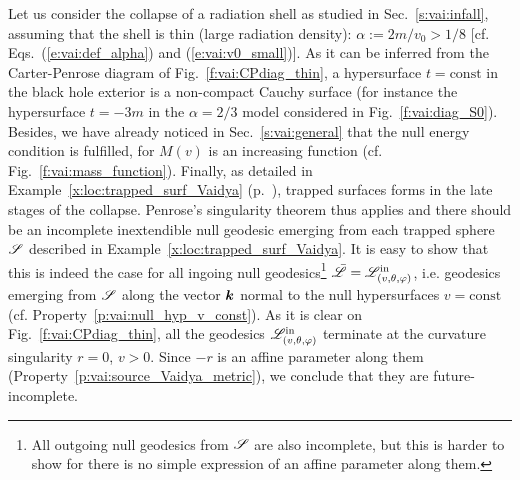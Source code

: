 \begin{example}
\label{x:loc:Penrose_thm_Vaidya}
Let us consider the collapse of a radiation shell
as studied in Sec.~\ref{s:vai:infall}, assuming that the shell is thin
(large radiation density): $\alpha := 2m/v_0 > 1/8$
[cf. Eqs.~(\ref{e:vai:def_alpha}) and (\ref{e:vai:v0_small})].
As it can be inferred from the Carter-Penrose diagram of Fig.~\ref{f:vai:CPdiag_thin},
a hypersurface $t=\mathrm{const}$ in the black hole exterior
is a non-compact Cauchy surface (for instance the hypersurface $t=-3m$ in
the $\alpha=2/3$ model considered in Fig.~\ref{f:vai:diag_S0}).
Besides, we have already noticed in Sec.~\ref{s:vai:general} that the null energy
condition is fulfilled, for $M(v)$ is an increasing function (cf. Fig.~\ref{f:vai:mass_function}).
Finally, as detailed in Example~\ref{x:loc:trapped_surf_Vaidya}
(p.~\pageref{x:loc:trapped_surf_Vaidya}), trapped surfaces forms in the late
stages of the collapse.
Penrose's singularity theorem thus applies and there should be
an incomplete inextendible null geodesic emerging from each trapped sphere $\mathscr{S}$
described in Example~\ref{x:loc:trapped_surf_Vaidya}.
It is easy to show that this is indeed the case for all ingoing null geodesics\footnote{All outgoing
null geodesics from $\mathscr{S}$ are also incomplete, but this is harder to show for there is no simple
expression of an affine parameter along them.}
$\bar{\mathscr{L}} = \mathscr{L}^{\rm in}_{(v,\theta,\varphi)}$, i.e. geodesics emerging from $\mathscr{S}$ along the vector $\bm{k}$
normal to the null hypersurfaces $v=\mathrm{const}$ (cf. Property~\ref{p:vai:null_hyp_v_const}).
As it is clear on Fig.~\ref{f:vai:CPdiag_thin}, all the geodesics $\mathscr{L}^{\rm in}_{(v,\theta,\varphi)}$
terminate at the curvature singularity $r=0$, $v>0$. Since $-r$ is an affine parameter along
them (Property~\ref{p:vai:source_Vaidya_metric}), we conclude that they are future-incomplete.
\end{example}

